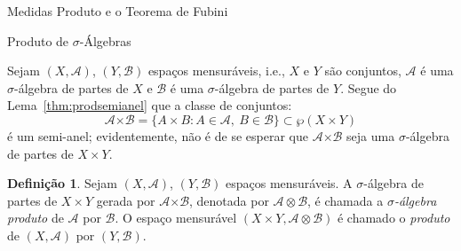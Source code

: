 \documentclass[oneside,final,11pt]{amsbook}
\newcommand{\Times}{\pmb{\times}}
\theoremstyle{remark}\newtheorem{exercise}{Exercício}[chapter]
\theoremstyle{remark}\newtheorem{*exercise}[exercise]{\hbox to 0pt{\hskip 0pt minus 1fil*}Exercício}
\theoremstyle{definition}\newtheorem{exdefin}{Definição}[chapter]
\theoremstyle{plain}\newtheorem{teo}{Teorema}[section]
\theoremstyle{plain}\newtheorem{lem}[teo]{Lema}
\theoremstyle{plain}\newtheorem{prop}[teo]{Proposição}
\theoremstyle{plain}\newtheorem{cor}[teo]{Corolário}
\theoremstyle{definition}\newtheorem{defin}[teo]{Definição}
\theoremstyle{remark}\newtheorem{rem}[teo]{Observação}
\theoremstyle{definition}\newtheorem{notation}[teo]{Notação}
\theoremstyle{definition}\newtheorem{convention}[teo]{Convenção}
\theoremstyle{definition}\newtheorem{example}[teo]{Exemplo}
\numberwithin{section}{chapter}
\numberwithin{equation}{section}
\begin{document}
\begin{chapter}{Medidas Produto e o Teorema de Fubini}
\label{CHP:PRODUTOS}

\begin{section}{Produto de ${\sigma}$-Álgebras}

Sejam $(X,\mathcal A)$, $(Y,\mathcal B)$ espaços mensuráveis, i.e., $X$ e $Y$ são conjuntos,
$\mathcal A$ é uma $\sigma$-álgebra de partes de $X$ e $\mathcal B$ é uma $\sigma$-álgebra
de partes de $Y$. Segue do Lema~\ref{thm:prodsemianel} que a classe de conjuntos:
\[\mathcal A\Times\mathcal B=\big\{A\times B:A\in\mathcal A,\ B\in\mathcal B\big\}\subset\wp(X\times Y)\]
é um semi-anel; evidentemente, não é de se esperar que $\mathcal A\Times\mathcal B$
seja uma $\sigma$-álgebra de partes de $X\times Y$.

\begin{defin}
Sejam $(X,\mathcal A)$, $(Y,\mathcal B)$ espaços mensuráveis. A $\sigma$-álgebra
de partes de $X\times Y$ gerada por $\mathcal A\Times\mathcal B$, denotada por
$\mathcal A\otimes\mathcal B$, é chamada
a {\em $\sigma$-álgebra produto\/}%
 de $\mathcal A$ por $\mathcal B$. O espaço mensurável
$(X\times Y,\mathcal A\otimes\mathcal B)$ é chamado o
{\em produto\/}%
 de $(X,\mathcal A)$ por $(Y,\mathcal B)$.
\end{defin}


\end{section}
\end{chapter}
\end{document}
